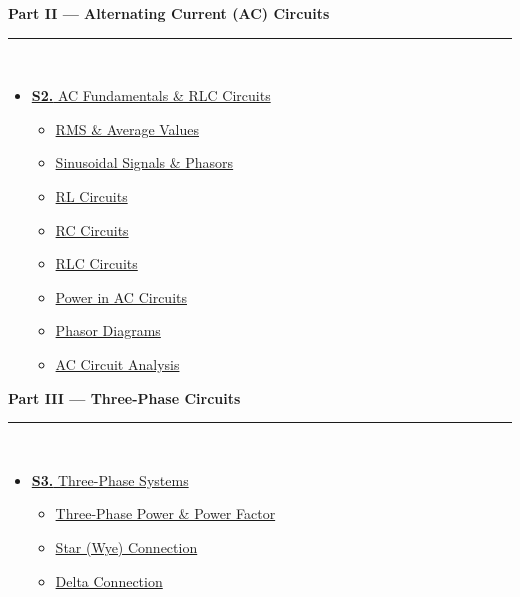 \documentclass[12pt,a3paper]{article}
\begin{document}
\begin{tcolorbox}[breakable,colback=cB!5,colframe=cB,boxrule=1pt,arc=5pt,
  left=8pt,right=8pt,top=8pt,bottom=8pt,before skip=4pt]
  {\large\bfseries\textcolor{cB}{Part II --- Alternating Current (AC) Circuits}}\\[5pt]
  \textcolor{cB!40}{\rule{\textwidth}{0.4pt}}\\[3pt]
  \small\begin{itemize}[leftmargin=1.2em,itemsep=1pt,label={\textcolor{cB}{$\triangleright$}}]
    \item \hyperref[sec:S2]{\textbf{S2.} AC Fundamentals \& RLC Circuits}
      \begin{itemize}[leftmargin=1.5em,itemsep=0pt,label={\textcolor{cB}{$\cdot$}}]
        \item \hyperref[sub:s2-rms]{RMS \& Average Values}
        \item \hyperref[sub:s2-sinusoidal]{Sinusoidal Signals \& Phasors}
        \item \hyperref[sub:s2-rl]{RL Circuits}
        \item \hyperref[sub:s2-rc]{RC Circuits}
        \item \hyperref[sub:s2-rlc]{RLC Circuits}
        \item \hyperref[sub:s2-power]{Power in AC Circuits}
        \item \hyperref[sub:s2-phasor]{Phasor Diagrams}
        \item \hyperref[sub:s2-circuit]{AC Circuit Analysis}
      \end{itemize}
  \end{itemize}
\end{tcolorbox}

\vspace{6pt}

\begin{tcolorbox}[breakable,colback=cC!5,colframe=cC,boxrule=1pt,arc=5pt,
  left=8pt,right=8pt,top=8pt,bottom=8pt,before skip=4pt]
  {\large\bfseries\textcolor{cC}{Part III --- Three-Phase Circuits}}\\[5pt]
  \textcolor{cC!40}{\rule{\textwidth}{0.4pt}}\\[3pt]
  \small\begin{itemize}[leftmargin=1.2em,itemsep=1pt,label={\textcolor{cC}{$\triangleright$}}]
    \item \hyperref[sec:S3]{\textbf{S3.} Three-Phase Systems}
      \begin{itemize}[leftmargin=1.5em,itemsep=0pt,label={\textcolor{cC}{$\cdot$}}]
        \item \hyperref[sub:s3-threephasepower]{Three-Phase Power \& Power Factor}
        \item \hyperref[sub:s3-star]{Star (Wye) Connection}
        \item \hyperref[sub:s3-delta]{Delta Connection}
      \end{itemize}
  \end{itemize}
\end{tcolorbox}
\end{document}
